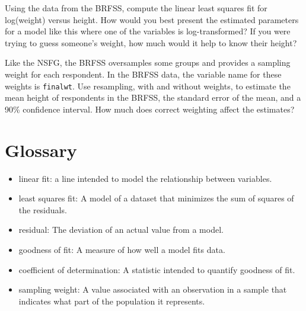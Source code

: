 \documentclass[12pt]{book}
\begin{document}
\begin{exercise}

Using the data from the BRFSS, compute the linear least squares
fit for log(weight) versus height.
How would you best present the estimated parameters for a model
like this where one of the variables is log-transformed?
If you were trying to guess
someone's weight, how much would it help to know their height?

Like the NSFG, the BRFSS oversamples some groups and provides
a sampling weight for each respondent.  In the BRFSS data, the variable
name for these weights is {\tt finalwt}.
Use resampling, with and without weights, to estimate the mean height
of respondents in the BRFSS, the standard error of the mean, and a
90\% confidence interval.  How much does correct weighting affect the
estimates?
\end{exercise}


\section{Glossary}

\begin{itemize}

\item linear fit: a line intended to model the relationship between
variables.  

\item least squares fit: A model of a dataset that minimizes the
sum of squares of the residuals.

\item residual: The deviation of an actual value from a model.

\item goodness of fit: A measure of how well a model fits data.

\item coefficient of determination: A statistic intended to
quantify goodness of fit.

\item sampling weight: A value associated with an observation in a
  sample that indicates what part of the population it represents.

\end{itemize}
\end{document}
